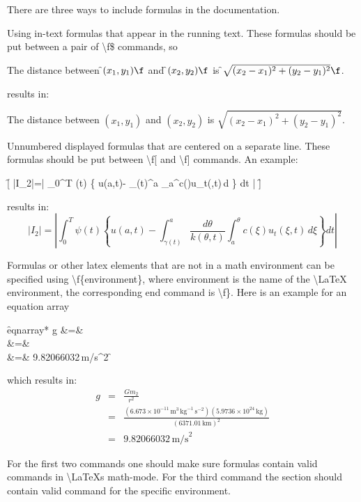 There are three ways to include formulas in the documentation. 
\begin{DoxyEnumerate}
\item Using in-\/text formulas that appear in the running text. These formulas should be put between a pair of \textbackslash{}f\$ commands, so \begin{DoxyVerb}  The distance between \f$(x_1,y_1)\f$ and \f$(x_2,y_2)\f$ is 
  \f$\sqrt{(x_2-x_1)^2+(y_2-y_1)^2}\f$.
\end{DoxyVerb}
 results in\+:

The distance between $(x_1,y_1)$ and $(x_2,y_2)$ is $\sqrt{(x_2-x_1)^2+(y_2-y_1)^2}$. ~\newline
 
\item Unnumbered displayed formulas that are centered on a separate line. These formulas should be put between \textbackslash{}f\mbox{[} and \textbackslash{}f\mbox{]} commands. An example\+: \begin{DoxyVerb}  \f[
    |I_2|=\left| \int_{0}^T \psi(t) 
             \left\{ 
                u(a,t)-
                \int_{\gamma(t)}^a 
                \int_{a}^\theta c(\xi)u_t(\xi,t)\,d\xi
             \right\} dt
          \right|
  \f]
\end{DoxyVerb}
 results in\+: \[ |I_2|=\left| \int_{0}^T \psi(t) \left\{ u(a,t)- \int_{\gamma(t)}^a \frac{d\theta}{k(\theta,t)} \int_{a}^\theta c(\xi)u_t(\xi,t)\,d\xi \right\} dt \right| \] 
\item Formulas or other latex elements that are not in a math environment can be specified using \textbackslash{}f\{environment\}, where {\ttfamily environment} is the name of the \textbackslash{}\+La\+TeX environment, the corresponding end command is \textbackslash{}f\}. Here is an example for an equation array \begin{DoxyVerb}   \f{eqnarray*}{
        g &=&  \\ 
          &=&  \\ 
          &=& 9.82066032\,\mbox{m/s}^2
   \f}
\end{DoxyVerb}
 which results in\+: \begin{eqnarray*} g &=& \frac{Gm_2}{r^2} \\ &=& \frac{(6.673 \times 10^{-11}\,\mbox{m}^3\,\mbox{kg}^{-1}\, \mbox{s}^{-2})(5.9736 \times 10^{24}\,\mbox{kg})}{(6371.01\,\mbox{km})^2} \\ &=& 9.82066032\,\mbox{m/s}^2 \end{eqnarray*} 
\end{DoxyEnumerate}For the first two commands one should make sure formulas contain valid commands in \textbackslash{}\+La\+TeX\textquotesingle{}s math-\/mode. For the third command the section should contain valid command for the specific environment.

